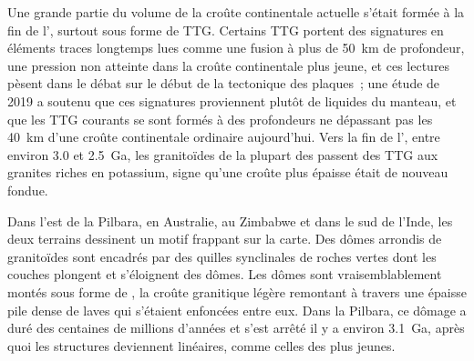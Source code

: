 Une grande partie du volume de la croûte continentale actuelle s'était formée à la fin de l', surtout
sous forme de TTG. Certains TTG portent des signatures en éléments traces longtemps lues comme une fusion à plus
de \qty{50}{km} de profondeur, une pression non atteinte dans la croûte continentale plus jeune, et ces lectures
pèsent dans le débat sur le début de la tectonique des plaques~; une étude de 2019 a soutenu que ces signatures
proviennent plutôt de liquides du manteau, et que les TTG courants se sont formés à des
profondeurs ne dépassant pas les \qty{40}{km} d'une croûte continentale ordinaire aujourd'hui. Vers la fin
de l', entre environ 3.0 et \qty{2.5}{Ga}, les granitoïdes de la plupart des  passent des TTG
aux granites riches en potassium, signe qu'une croûte plus épaisse était de nouveau fondue.

Dans l'est de la Pilbara, en Australie, au Zimbabwe et dans le sud de l'Inde, les deux terrains dessinent un
motif frappant sur la carte. Des dômes arrondis de granitoïdes sont encadrés par des quilles synclinales de roches vertes dont les couches plongent et s'éloignent des dômes. Les dômes sont
vraisemblablement montés sous forme de , la croûte granitique légère remontant à travers une épaisse pile dense de
laves qui s'étaient enfoncées entre eux. Dans la Pilbara, ce dômage a duré des centaines de millions
d'années et s'est arrêté il y a environ \qty{3.1}{Ga}, après quoi les structures deviennent linéaires,
comme celles des  plus jeunes.

